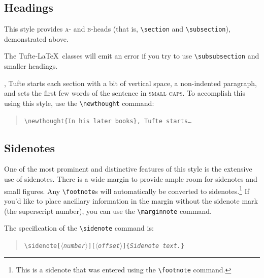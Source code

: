 \documentclass{tufte-handout}
\newcommand{\doccmd}[1]{\texttt{\textbackslash#1}}%
\newcommand{\docopt}[1]{\ensuremath{\langle}\textrm{\textit{#1}}\ensuremath{\rangle}}%
\newcommand{\docarg}[1]{\textrm{\textit{#1}}}%
\newenvironment{docspec}{\begin{quote}\noindent}{\end{quote}}%
\begin{document}
\subsection{Headings}\label{sec:headings}
This style provides \textsc{a}- and \textsc{b}-heads (that is,
\Verb|\section| and \Verb|\subsection|), demonstrated above.

The Tufte-\LaTeX\ classes will emit an error if you try to use
\linebreak\Verb|\subsubsection| and smaller headings.

,\cite{Tufte2006} Tufte
starts each section with a bit of vertical space, a non-indented paragraph,
and sets the first few words of the sentence in \textsc{small caps}.  To
accomplish this using this style, use the \Verb|\newthought| command:  
\begin{docspec}
  \doccmd{newthought\{In his later books\}, Tufte starts\ldots}
\end{docspec}

\subsection{Sidenotes}\label{sec:sidenotes}
One of the most prominent and distinctive features of this style is the
extensive use of sidenotes.  There is a wide margin to provide ample room
for sidenotes and small figures.  Any \Verb|\footnote|s will automatically
be converted to sidenotes.\footnote{This is a sidenote that was entered
using the \texttt{\textbackslash footnote} command.}  If you'd like to place ancillary
information in the margin without the sidenote mark (the superscript
number), you can use the \Verb|\marginnote| command.

The specification of the \Verb|\sidenote| command is:
\begin{docspec}
  \doccmd{sidenote[\docopt{number}][\docopt{offset}]\{\docarg{Sidenote text.}\}}
\end{docspec}
\end{document}
